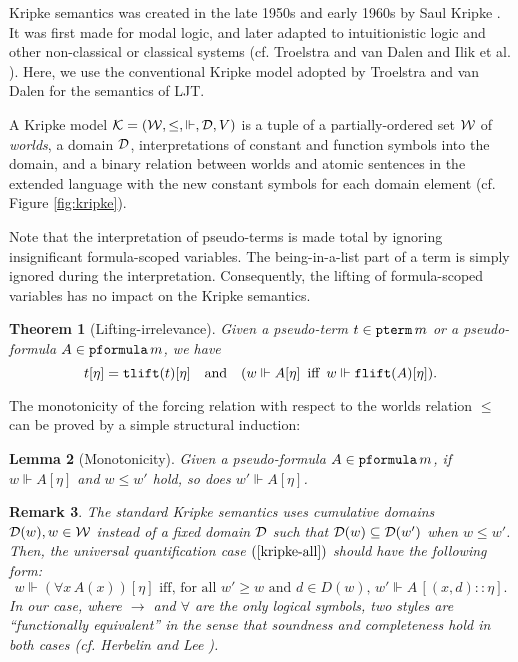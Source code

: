 \documentclass{svjour3}                     %
\newtheorem{thm}{Theorem}%
\newtheorem{lem}[thm]{Lemma}
\newtheorem{rem}[thm]{Remark}
\newcommand{\cald}{{\cal D}}
\newcommand{\calk}{{\cal K}}
\newcommand{\calw}{{\cal W}}
\newcommand{\Vd}{\Vdash}
\newcommand{\tpterm}{\textup{\tt pterm}}
\newcommand{\tpfml}{\textup{\tt pformula}}
\newcommand{\ttlift}{\textup{\tt tlift}}
\newcommand{\tflift}{\textup{\tt flift}}
\begin{document}
Kripke semantics was created in the late 1950s and early 1960s by Saul Kripke \cite{kripke59,kripke63}. It was first made for modal logic, and later adapted to intuitionistic logic and other non-classical or classical systems (cf. Troelstra and van Dalen \cite{TroelstraVanDalen88} and Ilik et al. \cite{danko-gyesik}). Here, we use the conventional Kripke model adopted by Troelstra and van Dalen \cite{TroelstraVanDalen88} for the semantics of LJT.

A Kripke model $\calk = (\calw, \le,\Vd , \cald, V )$ is a tuple of a partially-ordered set $\calw$ of {\em worlds}, a domain $\cald$, interpretations of constant and function symbols into the domain, and a binary relation between worlds and atomic sentences in the extended language with the new constant symbols for each domain element (cf. Figure \ref{fig:kripke}).

Note that the interpretation of pseudo-terms is made total by ignoring insignificant formula-scoped variables. The being-in-a-list part of a term is simply ignored during the interpretation. Consequently, the lifting of formula-scoped variables has no impact on the Kripke semantics.

\begin{thm}[Lifting-irrelevance]\label{thm:lifting}
  Given a pseudo-term $t \in \tpterm\, m$ or a pseudo-formula $A \in \tpfml\, m$, we have
  \[
  t [\eta] = \ttlift(t) [\eta] \quad \text{and}\quad
  (w \Vd A [\eta] \,\text{ iff }\, w \Vd  \tflift(A) [\eta]).
  \]
\end{thm}

\noindent The monotonicity of the forcing relation with respect to the worlds relation $\le$ can be proved by a simple structural induction:

\begin{lem}[Monotonicity]
  Given a pseudo-formula $A \in \tpfml\, m$, if $w \Vd A[\eta]$ and $w \le w'$ hold, so does $w' \Vd A [\eta]$.
\end{lem}

\begin{rem}\label{fun-equivalence}
The standard Kripke semantics uses cumulative domains $\cald (w), w\in \calw$ instead of a fixed domain $\cald$ such that $\cald (w) \subseteq \cald (w')$ when $w \le w'$. Then, the universal quantification case $(\ref{kripke-all})$ should have the following form:
\[
\text{$w \Vd (\forall x\, A(x)) [\eta]$ iff, for all $w'\ge w$ and $d\in D(w)$, $w' \Vd A\, [(x,d)::\eta]$}.
\]
In our case, where $\to$ and $\forall$ are the only logical symbols, two styles are ``functionally equivalent'' in the sense that soundness and completeness hold in both cases (cf. Herbelin and Lee \cite{wollic09}).
\end{rem}
\end{document}
